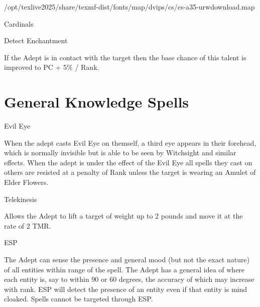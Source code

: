 /opt/texlive2025/share/texmf-dist/fonts/map/dvips/cs/cs-a35-urwdownload.map\documentclass{report}
\begin{document}
\begin{College}{Cardinals}
\begin{talent}[T-2]{Detect Enchantment}
\begin{effects}
If the Adept is in contact with the target then the base chance of
this talent is improved to PC + 5\% / Rank.
\end{effects}
\end{talent}

\section{General Knowledge Spells}

\begin{spell}[G-1]{Evil Eye}

\begin{effects}
When the adept casts Evil Eye on themself, a third eye appears in
their forehead, which is normally invisible but is able to be seen by
Witchsight and similar effects.  When the adept is under the effect of
the Evil Eye all spells they cast on others are resisted at a penalty
of Rank unless the target is wearing an Amulet of Elder Flowers.
\end{effects}
\end{spell}


\begin{spell}[G-2]{Telekinesis}
\begin{effects}
Allows the Adept to lift a target of weight up to 2 pounds and move it
at the rate of 2 TMR.
\end{effects}
\end{spell}

\begin{spell}[G-3]{ESP}

\begin{effects}
The Adept can sense the presence and general mood (but not the exact
nature) of all entities within range of the spell.  The Adept has a
general idea of where each entity is, say to within 90 or 60 degrees,
the accuracy of which may increase with rank.  ESP will detect the
presence of an entity even if that entity is mind cloaked. Spells
cannot be targeted through ESP.
\end{effects}
\end{spell}


\end{College}
\end{document}
